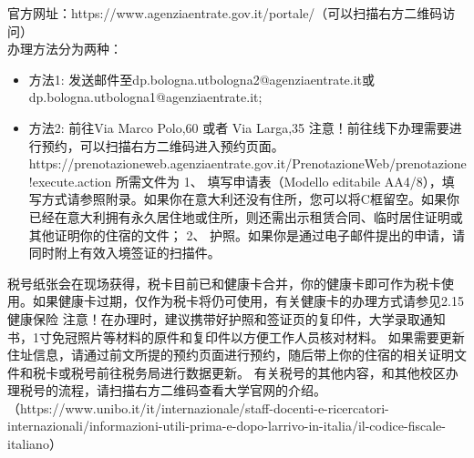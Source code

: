 官方网址：https://www.agenziaentrate.gov.it/portale/（可以扫描右方二维码访问）\\
办理方法分为两种：
\begin{itemize}
\item 方法1: 发送邮件至dp.bologna.utbologna2@agenziaentrate.it或dp.bologna.utbologna1@agenziaentrate.it;
\item 方法2: 前往Via Marco Polo,60 或者 Via Larga,35
 注意！前往线下办理需要进行预约，可以扫描右方二维码进入预约页面。
https://prenotazioneweb.agenziaentrate.gov.it/PrenotazioneWeb/prenotazione!execute.action
所需文件为
1、	填写申请表（Modello editabile AA4/8），填写方式请参照附录。如果你在意大利还没有住所，您可以将C框留空。如果你已经在意大利拥有永久居住地或住所，则还需出示租赁合同、临时居住证明或其他证明你的住宿的文件；
2、	护照。如果你是通过电子邮件提出的申请，请同时附上有效入境签证的扫描件。

\end{itemize}
税号纸张会在现场获得，税卡目前已和健康卡合并，你的健康卡即可作为税卡使用。如果健康卡过期，仅作为税卡将仍可使用，有关健康卡的办理方式请参见2.15 健康保险
注意！在办理时，建议携带好护照和签证页的复印件，大学录取通知书，1寸免冠照片等材料的原件和复印件以方便工作人员核对材料。
如果需要更新住址信息，请通过前文所提的预约页面进行预约，随后带上你的住宿的相关证明文件和税卡或税号前往税务局进行数据更新。
有关税号的其他内容，和其他校区办理税号的流程，请扫描右方二维码查看大学官网的介绍。（https://www.unibo.it/it/internazionale/staff-docenti-e-ricercatori-internazionali/informazioni-utili-prima-e-dopo-larrivo-in-italia/il-codice-fiscale-italiano）
